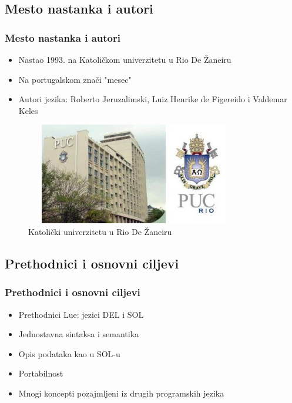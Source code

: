 \documentclass{beamer}
\begin{document}
\subsection{Mesto nastanka i autori}
\begin{frame} 
\frametitle{Mesto nastanka i autori}

\begin{itemize}
\item Nastao 1993. na  Katoličkom univerzitetu u Rio De Žaneiru 
\item Na portugalskom znači "mesec"
\item Autori jezika: Roberto Jeruzalimski, Luiz Henrike de Figereido i Valdemar Keles

\end{itemize}

\begin{figure}
\includegraphics[width=270pt, height=126pt]{fakultet.jpg}
\caption{Katolički univerzitetu u Rio De Žaneiru}
\end{figure}

\end{frame}


\subsection{Prethodnici i osnovni ciljevi}
\begin{frame}
\frametitle{Prethodnici i osnovni ciljevi}

\begin{itemize}
\item Prethodnici Lue: jezici DEL i SOL

\item Jednostavna sintaksa i semantika

\item Opis podataka  kao  u  SOL-u   

\item Portabilnost  

\item  Mnogi koncepti pozajmljeni iz drugih programskih jezika

\end{itemize}
\end{frame}
\end{document}
